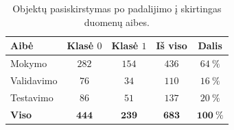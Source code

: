 \begin{table}[H]
    \centering
    \caption{Objektų pasiskirstymas po padalijimo į skirtingas duomenų aibes.}
    \begin{tabular}{|l|c|c|c|c|}
        \hline
        Aibė & Klasė $0$ & Klasė $1$ & Iš viso & Dalis \\
        \hline
        Mokymo & $282$ & $154$ & $436$ & $64\ \%$ \\ \hline
        Validavimo & $76$ & $34$ & $110$ & $16\ \%$ \\ \hline
        Testavimo & $86$ & $51$ & $137$ & $20\ \%$ \\ \hline
        \textbf{Viso} & $\mathbf{444}$ & $\mathbf{239}$ & $\mathbf{683}$ & $\mathbf{100\ \%}$ \\ \hline
    \end{tabular}
    \label{tab:objektu_pasiskirstymas}
\end{table}